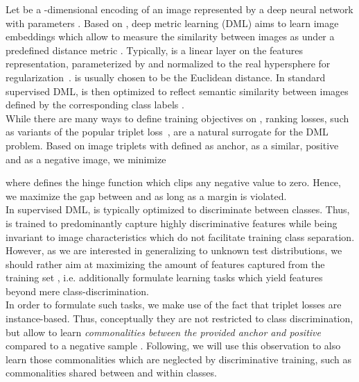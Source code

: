 \documentclass[runningheads]{llncs}
\begin{document}
Let  be a -dimensional encoding of an image  represented by a deep neural network with parameters . Based on , deep metric learning (DML) aims to learn image embeddings  which allow to measure the similarity between images  as  under a predefined distance metric . Typically,  is a linear layer on the features  representation, parameterized by  and normalized to the real hypersphere  for regularization~\cite{margin}.  is usually chosen to be the Euclidean distance. In standard supervised DML,  is then optimized to reflect semantic similarity between images  defined by the corresponding class labels .
\\
While there are many ways to define training objectives on , ranking losses, such as variants of the popular triplet loss~\cite{margin,npairs,lifted}, are a natural surrogate for the DML problem. Based on image triplets  with  defined as anchor,  as a similar, positive and  as a negative image, we minimize 

\noindent
where  defines the hinge function which clips any negative value to zero. Hence, we maximize the gap between  and  as long as a margin  is violated. 
\\
In supervised DML,  is typically optimized to discriminate between classes. Thus,  is trained to predominantly capture highly discriminative features while being invariant to image characteristics which do not facilitate training class separation. However, as we are interested in generalizing to unknown test distributions, we should rather aim at maximizing the amount of features captured from the training set , i.e. additionally formulate learning tasks which yield features beyond mere class-discrimination.
\\
In order to formulate such tasks, we make use of the fact that triplet losses are instance-based. Thus, conceptually they are not restricted to class discrimination, but allow to learn \textit{commonalities between the provided anchor  and positive } compared to a negative sample . Following, we will use this observation to also learn those commonalities which are neglected by discriminative training, such as commonalities shared between and within classes.
\end{document}
